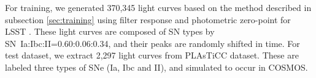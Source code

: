\documentclass[useamsfonts]{pasj01}
\begin{document}

For training, we generated 370,345 light curves based on the method described in subsection \ref{sec:training} using filter response and photometric zero-point for LSST \citep{ivezic19a}.
These light curves are composed of SN types by SN~Ia:Ibc:II=0.60:0.06:0.34, and their peaks are randomly shifted in time.
%
For test dataset, we extract 2,297 light curves from PLAsTiCC dataset.
These are labeled three types of SNe (Ia, Ibc and II), and simulated to occur in COSMOS.
\end{document}
